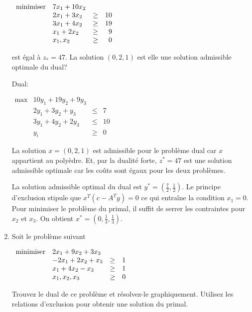 \begin{enumerate}
    $
    \begin{array}{llcr}
      \mbox{minimiser} & 7x_1+10x_2\\
      & 2x_1+3x_2 & \geq & 10\\
      & 3x_1+4x_2 & \geq & 19\\
      & x_1+2x_2 & \geq & 9\\
      & x_1, x_2 & \geq & 0
    \end{array}
    $

    est égal à $z_*=47$. La solution $(0, 2, 1)$ est elle une solution admissible optimale du dual?


    \begin{solution}
      Dual:

      $
      \begin{array}{llcr}
        \max & 10y_{1} + 19y_{2} + 9y_{3}\\
        & 2y_{1} + 3y_{2} + y_{3} & \leq & 7\\
        & 3y_{1} + 4y_{2} + 2y_{3} & \leq & 10\\
        & y_{i} & \geq & 0
      \end{array}
      $

      La solution $x = (0,2,1)$ est admissible pour le problème dual car $x$ appartient au polyèdre. Et,
      par la dualité forte, $z^{*} = 47$ est une solution admissible optimale car les coûts sont égaux pour les deux problèmes.




      La solution admissible optimal du dual est $y^{*} = (\frac{7}{2}, \frac{1}{2})$. Le principe d'exclusion stipule que $x^{T}(c-A^{T}y) = 0$ ce qui entraîne la condition $x_{1} = 0$.  Pour minimiser le problème du primal, il suffit de serrer les contraintes pour $x_{2}$ et $x_{3}$. On obtient $x^{*} = (0, \frac{1}{3}, \frac{1}{3})$.
    \end{solution}

  \item Soit le problème suivant

    $
    \begin{array}{llcr}
      \mbox{minimiser} & 2x_1+9x_2+3x_3\\
      & -2x_1+2x_2 +x_3 & \geq & 1\\
      & x_1+4x_2 -x_3 & \geq & 1\\
      & x_1, x_2, x_3 & \geq & 0
    \end{array}
    $

    Trouvez le dual de ce problème et résolvez-le graphiquement. Utilisez les relations d'exclusion pour obtenir une solution du primal.


\end{enumerate}
